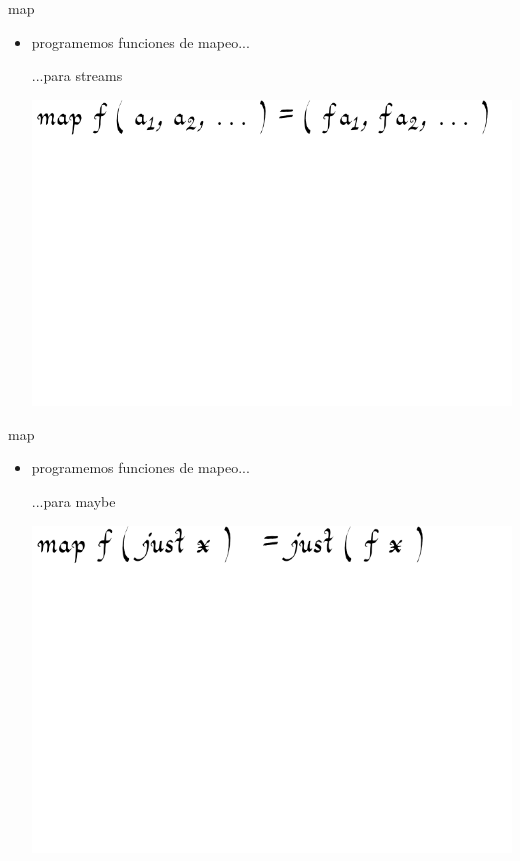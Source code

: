 \documentclass[9pt]{beamer}
\begin{document}
\begin{frame}{map}
  \begin{itemize}
  \item programemos funciones de mapeo...
    \begin{block}{...para streams}\end{block}
    \pause \vspace{1.2cm}
    \begin{center}\hspace{-2cm}\includegraphics[scale=0.5]{img/mapstream}\end{center}
  \end{itemize}
\end{frame}


\begin{frame}{map}
  \begin{itemize}
  \item programemos funciones de mapeo...
    \begin{block}{...para maybe}\end{block}
    \pause \vspace{1.2cm}
    \begin{center}\hspace{-2cm}\includegraphics[scale=0.5]{img/mapmaybe}\end{center}
  \end{itemize}
\end{frame}
\end{document}
